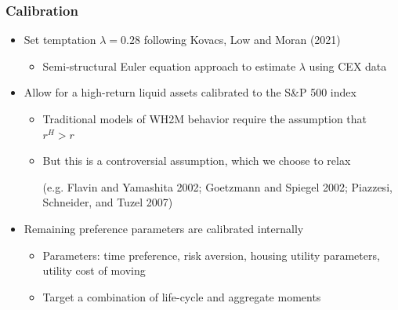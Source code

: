 \documentclass[10pt,english,t,10pt]{beamer}
\begin{document}
\begin{frame}[label=Calibration]
\frametitle{Calibration}
\begin{itemize}
%
%

\item Set temptation $\lambda = 0.28$ following Kovacs, Low and Moran (2021)
\medskip
\begin{itemize}
	\item Semi-structural Euler equation approach to estimate $\lambda$ using CEX data
\end{itemize}


\bigskip
\pause


\item Allow for a high-return liquid assets calibrated to the S\&P 500 index
\medskip
\begin{itemize}
	
	\item Traditional models of WH2M behavior require the assumption that $r^H > r$
	\medskip 
	\item But this is a controversial assumption, which we choose to relax %
	
	\textcolor{mygray}{(e.g. Flavin and Yamashita 2002; Goetzmann and 
		Spiegel 2002; Piazzesi, Schneider, and Tuzel 2007)}
\end{itemize}


\bigskip
\pause


\item Remaining preference parameters are calibrated internally 
\medskip
\begin{itemize}
	
	\item Parameters: time preference, risk aversion, housing utility parameters, utility cost of moving 
	\medskip 
	\item Target a combination of life-cycle and aggregate moments
\end{itemize}


\end{itemize}
\end{frame}
\end{document}
